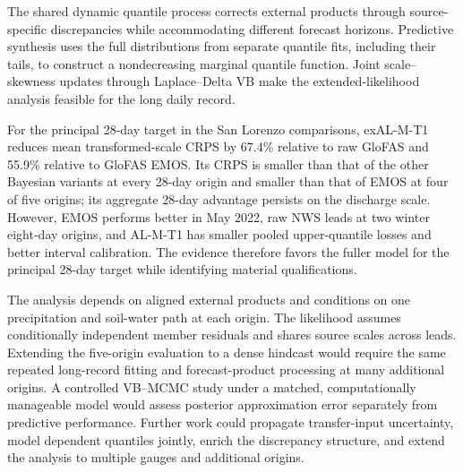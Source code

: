 The shared dynamic quantile process corrects external products through
source-specific discrepancies while accommodating different forecast
horizons. Predictive synthesis uses the full distributions from separate
quantile fits, including their tails, to construct a nondecreasing marginal
quantile function. Joint scale--skewness updates through Laplace--Delta VB make
the extended-likelihood analysis feasible for the long daily record.

For the principal 28-day target in the San Lorenzo comparisons, exAL-M-T1
reduces mean transformed-scale CRPS by 67.4\%
relative to raw GloFAS and 55.9\% relative to GloFAS EMOS. Its CRPS is smaller
than that of the other Bayesian variants at every 28-day origin and smaller
than that of EMOS at four of five origins; its aggregate 28-day advantage
persists on the discharge scale.
However, EMOS performs better in May 2022, raw NWS leads at two winter
eight-day origins, and AL-M-T1 has smaller pooled upper-quantile losses and
better interval calibration. The evidence therefore favors the fuller model
for the principal 28-day target while identifying material qualifications.

The analysis depends on aligned external products and conditions on one
precipitation and soil-water path at each origin. The likelihood assumes
conditionally independent member residuals and shares source scales across
leads. Extending the five-origin evaluation to a dense hindcast would require
the same repeated long-record fitting and forecast-product processing at many
additional origins. A controlled
VB--MCMC study under a matched, computationally manageable model would assess
posterior approximation error separately from predictive performance.
Further work could propagate transfer-input uncertainty, model dependent
quantiles jointly, enrich the discrepancy structure, and extend the analysis
to multiple gauges and additional origins.
